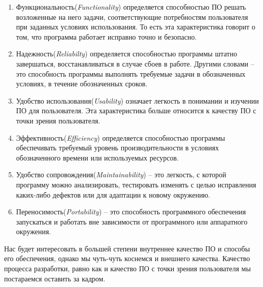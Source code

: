 \begin{enumerate}
  \item Функциональность(\textit{Functionality}) определяется способностью ПО решать возложенные на него задачи, соответствующие потребностям пользователя при заданных условиях использования. То есть эта характеристика говорит о том, что программа работает исправно точно и безопасно.
  \item Надежность(\textit{Reliabilty}) определяется способностью программы штатно завершаться, восстанавливаться в случае сбоев в работе. Другими словами -- это способность программы выполнять требуемые задачи в обозначенных условиях, в течение обозначенных сроков.
  \item Удобство использования(\textit{Usability}) означает легкость в понимании и изучении ПО для пользователя. Эта характеристика больше относится к качеству ПО с точки зрения пользователя.
  \item Эффективность(\textit{Efficiency}) определяется способностью программы обеспечивать требуемый уровень производительности в условиях обозначенного времени или используемых ресурсов.
  \item Удобство сопровождения(\textit{Maintainability}) -- это легкость, с которой программу можно анализировать, тестировать изменять с целью исправления каких-либо дефектов или для адаптации к новому окружению.
  \item Переносимость(\textit{Portability}) -- это способность программного обеспечения запускаться и работать вне зависимости от программного или аппаратного окружения.
\end{enumerate}

Нас будет интересовать в большей степени внутреннее качество ПО и способы его обеспечения, однако мы чуть-чуть коснемся и внешнего качества. Качество процесса разработки, равно как и качество ПО с точки зрения пользователя мы постараемся оставить за кадром.
